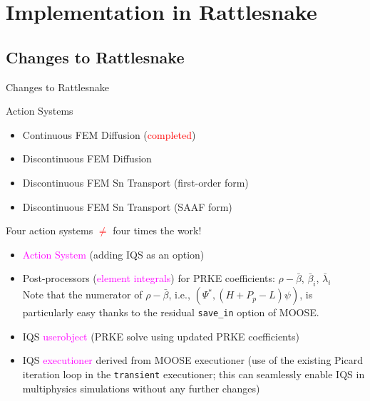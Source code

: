 \documentclass[8pt]{beamer}
\newcommand{\bi}{\begin{itemize}}
\newcommand{\ei}{\end{itemize}}
\newcommand{\tcr}[1]{\textcolor{red}{#1}}
\newcommand{\tcm}[1]{\textcolor{magenta}{#1}}
\begin{document}
\section{Implementation in Rattlesnake}

\subsection{Changes to Rattlesnake}

\begin{frame}{Changes to Rattlesnake}

\begin{block}{Action Systems}
\bi
\item Continuous FEM Diffusion (\tcr{completed})
\item Discontinuous FEM Diffusion
\item Discontinuous FEM Sn Transport (first-order form)
\item Discontinuous FEM Sn Transport (SAAF form)
\ei
Four action systems \tcr{$\ne$} four times the work!
\end{block}

\begin{block}{}
\bi
\item \tcm{Action System} (adding IQS as an option)
\item Post-processors (\tcm{element integrals}) for PRKE coefficients: $\rho-\bar{\beta}$, $\bar{\beta}_i$, $\bar{\lambda}_i$\\
Note that the numerator of $\rho-\bar{\beta}$, i.e., $\left( \Psi^{*}, (H+P_p-L) \psi \right)$, is particularly easy thanks to the residual {\tt save\_in} option of MOOSE.
\item IQS \tcm{userobject} (PRKE solve using updated PRKE coefficients)
\item IQS \tcm{executioner} derived from MOOSE executioner (use of the existing Picard iteration loop in the {\tt transient} executioner; this can seamlessly enable IQS in multiphysics simulations without any further changes)
\ei
\end{block}

\end{frame}
\end{document}
